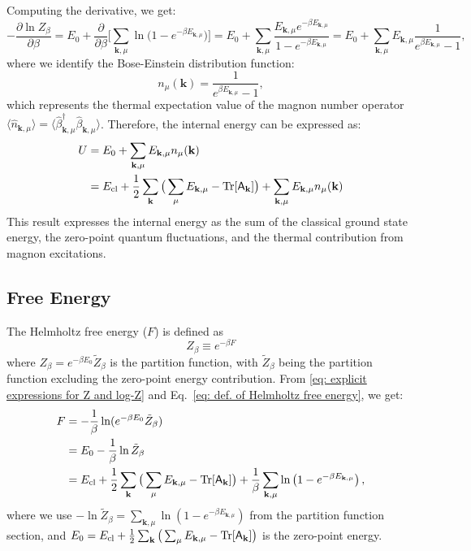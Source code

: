 \documentclass[aps, prx, nofootinbib, superscriptaddress]{revtex4-2}
\newcommand{\kvec}{\mathbf{k}}
\newcommand{\Tr}{\mathrm{Tr}}
\begin{document}
Computing the derivative, we get:
\begin{equation}
     - \frac{\partial \ln Z_{\beta}}{\partial \beta} 
    = E_{0} + \frac{\partial}{\partial \beta} \Big[  \sum_{\kvec, \mu} \ln \big( 1 - e^{- \beta E_{\kvec, \mu}} \big) \Big]
    = E_{0} + \sum_{\kvec, \mu} \frac{E_{\kvec, \mu} e^{-\beta E_{\kvec, \mu}}}{1 - e^{-\beta E_{\kvec, \mu}}}  
    = E_{0} + \sum_{\kvec, \mu} E_{\kvec, \mu} \frac{1}{e^{\beta E_{\kvec, \mu}} - 1},
\end{equation}
where we identify the Bose-Einstein distribution function:
\begin{equation}
    n_{\mu} (\kvec) = \frac{1}{e^{\beta E_{\kvec, \mu}} - 1},
\end{equation}
which represents the thermal expectation value of the magnon number operator $\langle\hat{n}_{\kvec, \mu}\rangle = \langle \hat{\beta}^{\dagger}_{\kvec, \mu} \hat{\beta}_{\kvec,\mu} \rangle$.
Therefore, the internal energy can be expressed as:
\begin{align}
    U &= E_0 + \sum_{\kvec, \mu} E_{\kvec, \mu} n_{\mu} (\kvec) \nonumber \\
    &= E_{\rm cl} + \frac{1}{2} \sum_{\kvec} \big( \sum_{\mu} E_{\kvec, \mu} - \Tr [\mathsf{A}_{\kvec}] \big) + \sum_{\kvec, \mu} E_{\kvec, \mu} n_{\mu}(\kvec)
\end{align}
This result expresses the internal energy as the sum of the classical ground state energy, the zero-point quantum fluctuations, and the thermal contribution from magnon excitations.



\subsection{Free Energy}\label{subsec: Free Energy}
The Helmholtz free energy ($F$) is defined as 
\begin{equation}\label{eq: def. of Helmholtz free energy}
    Z_{\beta} \equiv e^{-\beta F}
\end{equation}
where $Z_{\beta} = e^{- \beta E_0} \tilde{Z}_{\beta}$ is the partition function, with $\tilde{Z}_{\beta}$ being the partition function excluding the zero-point energy contribution.
From \eqref{eq: explicit expressions for Z and log-Z} and Eq.~\eqref{eq: def. of Helmholtz free energy}, we get:
\begin{align}
    F &= -\frac{1}{\beta} \ln(e^{- \beta E_0} \tilde{Z}_{\beta}) \nonumber \\
    &= E_0 - \frac{1}{\beta} \ln \tilde{Z}_{\beta} \nonumber \\
    &= E_{\rm cl} + \frac{1}{2} \sum_{\kvec} \big( \sum_{\mu} E_{\kvec, \mu} - \Tr [\mathsf{A}_{\kvec}] \big) + \frac{1}{\beta} \sum_{\kvec, \mu} \ln \left( 1 - e^{-\beta E_{\kvec, \mu}} \right),
\end{align}
where we use $-\ln \tilde{Z}_{\beta} = \sum_{\kvec, \mu} \ln \left( 1 - e^{-\beta E_{\kvec, \mu}} \right)$ from the partition function section, and $E_0 = E_{\rm cl} + \frac{1}{2} \sum_{\kvec} \big( \sum_{\mu} E_{\kvec, \mu} - \Tr [\mathsf{A}_{\kvec}] \big)$ is the zero-point energy.
\end{document}

